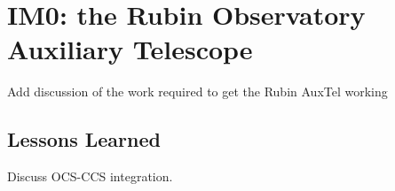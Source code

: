 \section{IM0: the Rubin Observatory Auxiliary Telescope}

Add discussion of the work required to get the Rubin AuxTel working

\subsection{Lessons Learned}

Discuss \eg \gls{OCS}-\gls{CCS} integration.
